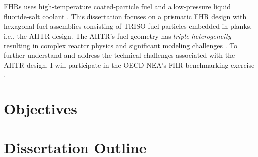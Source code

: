 \glspl{FHR} uses high-temperature coated-particle fuel and a low-pressure liquid 
fluoride-salt coolant
\cite{forsberg_fluoride-salt-cooled_2012,facilitators_fluoride-salt-cooled_2013}.
This dissertation focuses on a prismatic \gls{FHR} design with hexagonal fuel 
assemblies consisting of \gls{TRISO} fuel particles embedded in planks, i.e., 
the \gls{AHTR} design.
The \gls{AHTR}'s fuel geometry has \emph{triple heterogeneity} resulting in 
complex reactor physics and significant modeling challenges 
\cite{petrovic_benchmark_2021}. 
To further understand and address the technical challenges associated with the 
\gls{AHTR} design, I will participate in the \gls{OECD}-\gls{NEA}'s \gls{FHR} 
benchmarking exercise \cite{petrovic_benchmark_2021}.

\section{Objectives}

\section{Dissertation Outline}